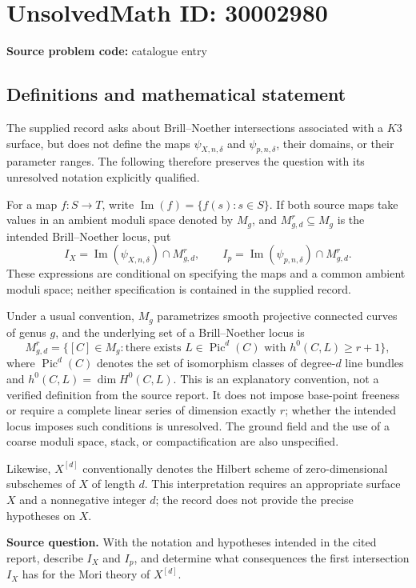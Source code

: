 \documentclass[11pt]{article}
\begin{document}
\section*{UnsolvedMath ID: 30002980}
\textbf{Source problem code:} catalogue entry
\subsection{Definitions and mathematical statement}
The supplied record asks about Brill--Noether intersections associated with a \(K3\) surface, but does not define the maps \(\psi_{X,n,\delta}\) and \(\psi_{p,n,\delta}\), their domains, or their parameter ranges. The following therefore preserves the question with its unresolved notation explicitly qualified.

For a map \(f\colon S\to T\), write \(\operatorname{Im}(f)=\{f(s):s\in S\}\). If both source maps take values in an ambient moduli space denoted by \(M_g\), and \(M^r_{g,d}\subseteq M_g\) is the intended Brill--Noether locus, put
\[
I_X=\operatorname{Im}(\psi_{X,n,\delta})\cap M^r_{g,d},
\qquad
I_p=\operatorname{Im}(\psi_{p,n,\delta})\cap M^r_{g,d}.
\]
These expressions are conditional on specifying the maps and a common ambient moduli space; neither specification is contained in the supplied record.

Under a usual convention, \(M_g\) parametrizes smooth projective connected curves of genus \(g\), and the underlying set of a Brill--Noether locus is
\[
M^r_{g,d}
 =\bigl\{[C]\in M_g:\text{there exists }L\in\operatorname{Pic}^{d}(C)
 \text{ with }h^0(C,L)\ge r+1\bigr\},
\]
where \(\operatorname{Pic}^{d}(C)\) denotes the set of isomorphism classes of degree-\(d\) line bundles and \(h^0(C,L)=\dim H^0(C,L)\). This is an explanatory convention, not a verified definition from the source report. It does not impose base-point freeness or require a complete linear series of dimension exactly \(r\); whether the intended locus imposes such conditions is unresolved. The ground field and the use of a coarse moduli space, stack, or compactification are also unspecified.

Likewise, \(X^{[d]}\) conventionally denotes the Hilbert scheme of zero-dimensional subschemes of \(X\) of length \(d\). This interpretation requires an appropriate surface \(X\) and a nonnegative integer \(d\); the record does not provide the precise hypotheses on \(X\).

\textbf{Source question.} With the notation and hypotheses intended in the cited report, describe \(I_X\) and \(I_p\), and determine what consequences the first intersection \(I_X\) has for the Mori theory of \(X^{[d]}\).
\end{document}
